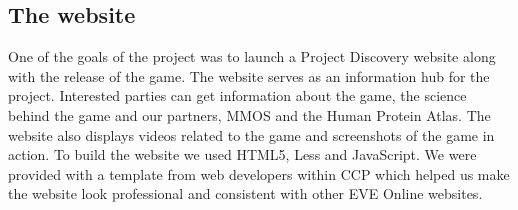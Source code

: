 \subsection{The website}
	One of the goals of the project was to launch a Project Discovery website along with the release of the game. The website serves as an information hub for the project. Interested parties can get information about the game, the science behind the game and our partners, MMOS and the Human Protein Atlas. The website also displays videos related to the game and screenshots of the game in action. To build the website we used HTML5, Less and JavaScript. We were provided with a template from web developers within CCP which helped us make the website look professional and consistent with other EVE Online websites.

